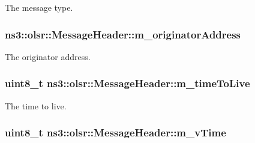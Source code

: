 The message type. 

\subsubsection[{\texorpdfstring{m\+\_\+originator\+Address}{m_originatorAddress}}]{ ns3\+::olsr\+::\+Message\+Header\+::m\+\_\+originator\+Address\hspace{0.3cm}{\ttfamily [private]}}\hypertarget{classns3_1_1olsr_1_1MessageHeader_a6539ef7254b52fb4f177eff2a87841aa}{}\label{classns3_1_1olsr_1_1MessageHeader_a6539ef7254b52fb4f177eff2a87841aa}


The originator address. 

\subsubsection[{\texorpdfstring{m\+\_\+time\+To\+Live}{m_timeToLive}}]{\setlength{\rightskip}{0pt plus 5cm}uint8\+\_\+t ns3\+::olsr\+::\+Message\+Header\+::m\+\_\+time\+To\+Live\hspace{0.3cm}{\ttfamily [private]}}\hypertarget{classns3_1_1olsr_1_1MessageHeader_a87ed6c82b53777bebefa1179b8de38ba}{}\label{classns3_1_1olsr_1_1MessageHeader_a87ed6c82b53777bebefa1179b8de38ba}


The time to live. 

\subsubsection[{\texorpdfstring{m\+\_\+v\+Time}{m_vTime}}]{\setlength{\rightskip}{0pt plus 5cm}uint8\+\_\+t ns3\+::olsr\+::\+Message\+Header\+::m\+\_\+v\+Time\hspace{0.3cm}{\ttfamily [private]}}\hypertarget{classns3_1_1olsr_1_1MessageHeader_a7ca99f2201bea16ad49231673a44d24f}{}\label{classns3_1_1olsr_1_1MessageHeader_a7ca99f2201bea16ad49231673a44d24f}


